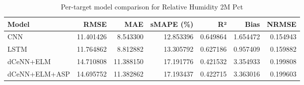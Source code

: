 \begin{table}
\caption{Per-target model comparison for Relative Humidity 2M Pct}
\begin{tabular}{lrrrrrr}
\toprule
Model & RMSE & MAE & sMAPE (\%) & R² & Bias & NRMSE \\
\midrule
CNN & 11.401426 & 8.543300 & 12.853396 & 0.649864 & 1.654472 & 0.154943 \\
LSTM & 11.764862 & 8.812882 & 13.305792 & 0.627186 & 0.957409 & 0.159882 \\
dCeNN+ELM & 14.710808 & 11.388150 & 17.191776 & 0.421532 & 3.354933 & 0.199808 \\
dCeNN+ELM+ASP & 14.695752 & 11.382862 & 17.193437 & 0.422715 & 3.363016 & 0.199603 \\
\bottomrule
\end{tabular}
\end{table}
